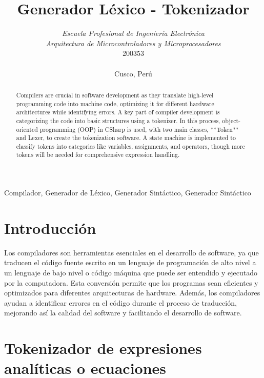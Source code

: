 \documentclass[conference]{IEEEtran}
\begin{document}
	
	\title{Generador Léxico - Tokenizador}
	\author{	
		\textit{Escuela Profesional de Ingeniería Electrónica}\\
		\textit{Arquitectura de Microcontroladores y Microprocesadores}\\
		200353 \\\\
		Cusco, Perú
	}
	
	\maketitle
	
	\begin{abstract}
		Compilers are crucial in software development as they translate high-level programming code into machine code, optimizing it for different hardware architectures while identifying errors. A key part of compiler development is categorizing the code into basic structures using a tokenizer. In this process, object-oriented programming (OOP) in CSharp is used, with two main classes, **Token** and Lexer, to create the tokenization software. A state machine is implemented to classify tokens into categories like variables, assignments, and operators, though more tokens will be needed for comprehensive expression handling.
	\end{abstract}
	
	\begin{IEEEkeywords}
		Compilador, Generador de Léxico, Generador Sintáctico, Generador Sintáctico
	\end{IEEEkeywords}
	
	\section{Introducción}
		Los compiladores son herramientas esenciales en el desarrollo de software, ya que traducen el código fuente escrito en un lenguaje de programación de alto nivel a un lenguaje de bajo nivel o código máquina que puede ser entendido y ejecutado por la computadora. Esta conversión permite que los programas sean eficientes y optimizados para diferentes arquitecturas de hardware. Además, los compiladores ayudan a identificar errores en el código durante el proceso de traducción, mejorando así la calidad del software y facilitando el desarrollo de software.
	
	\section{Tokenizador de expresiones analíticas o ecuaciones}
	
\end{document}
